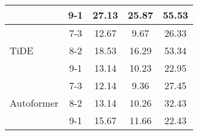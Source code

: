 \begin{table}[h!]
\begin{tabular}{|l|c|c|c|c|}
    \rowcolor{white}  & 9-1 & 27.13 & 25.87 & 55.53 \\ \hline
    \rowcolor{white!30} & 7-3 & 12.67 & 9.67 & 26.33 \\ 
    \rowcolor{white!30} TiDE & 8-2 & 18.53 & 16.29 & 53.34 \\ 
    \rowcolor{white!30} & 9-1 & 13.14 & 10.23 & 22.95 \\ \hline
    \rowcolor{white}  & 7-3 & 12.14 & 9.36 & 27.45 \\ 
    \rowcolor{white}  Autoformer & 8-2 & 13.14 & 10.26 & 32.43 \\ 
    \rowcolor{white}  & 9-1 & 15.67 & 11.66 & 22.43 \\ \hline

    \end{tabular}
\end{table}